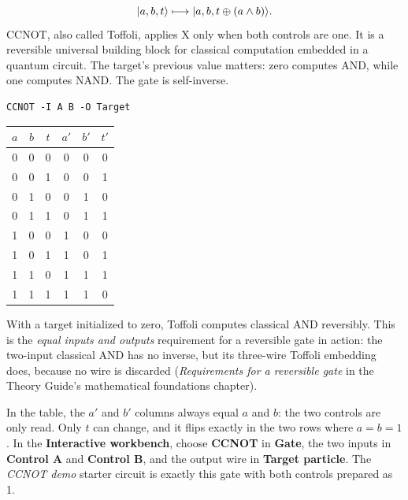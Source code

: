 \[
\lvert a,b,t\rangle\longmapsto\lvert a,b,t\oplus(a\land b)\rangle.
\]
CCNOT, also called Toffoli, applies X only when both controls are one. It is a
reversible universal building block for classical computation embedded in a
quantum circuit. The target's previous value matters: zero computes AND, while
one computes NAND. The gate is self-inverse.
\begin{lstlisting}
CCNOT -I A B -O Target
\end{lstlisting}
\begin{center}
\begin{tabular}{ccc|ccc}\toprule $a$&$b$&$t$&$a'$&$b'$&$t'$\\\midrule
0&0&0&0&0&0\\0&0&1&0&0&1\\
0&1&0&0&1&0\\0&1&1&0&1&1\\
1&0&0&1&0&0\\1&0&1&1&0&1\\
1&1&0&1&1&1\\1&1&1&1&1&0\\\bottomrule
\end{tabular}
\end{center}
With a target initialized to zero, Toffoli computes classical AND reversibly.
This is the \emph{equal inputs and outputs} requirement for a reversible gate
in action: the two-input classical AND has no inverse, but its three-wire
Toffoli embedding does, because no wire is discarded (\emph{Requirements for
a reversible gate} in the Theory Guide's mathematical foundations chapter).

\begin{beginnerbox}
In the table, the $a'$ and $b'$ columns always equal $a$ and $b$: the two
controls are only read. Only $t$ can change, and it flips exactly in the two
rows where $a=b=1$. In the \textbf{Interactive workbench}, choose
\textbf{CCNOT} in \textbf{Gate}, the two inputs in \textbf{Control A} and
\textbf{Control B}, and the output wire in \textbf{Target particle}. The
\emph{CCNOT demo} starter circuit is exactly this gate with both controls
prepared as 1.
\end{beginnerbox}


